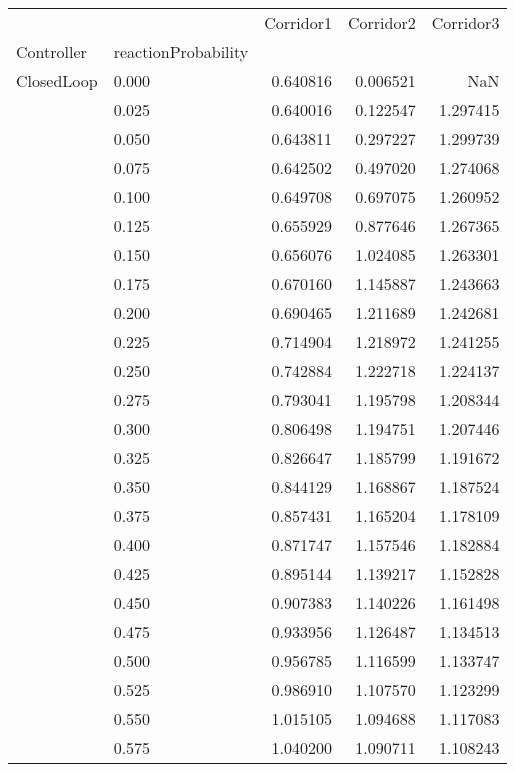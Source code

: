 \begin{tabular}{llrrr}
\toprule
         &       &  Corridor1 &  Corridor2 &  Corridor3 \\
Controller & reactionProbability &            &            &            \\
\midrule
ClosedLoop & 0.000 &   0.640816 &   0.006521 &        NaN \\
         & 0.025 &   0.640016 &   0.122547 &   1.297415 \\
         & 0.050 &   0.643811 &   0.297227 &   1.299739 \\
         & 0.075 &   0.642502 &   0.497020 &   1.274068 \\
         & 0.100 &   0.649708 &   0.697075 &   1.260952 \\
         & 0.125 &   0.655929 &   0.877646 &   1.267365 \\
         & 0.150 &   0.656076 &   1.024085 &   1.263301 \\
         & 0.175 &   0.670160 &   1.145887 &   1.243663 \\
         & 0.200 &   0.690465 &   1.211689 &   1.242681 \\
         & 0.225 &   0.714904 &   1.218972 &   1.241255 \\
         & 0.250 &   0.742884 &   1.222718 &   1.224137 \\
         & 0.275 &   0.793041 &   1.195798 &   1.208344 \\
         & 0.300 &   0.806498 &   1.194751 &   1.207446 \\
         & 0.325 &   0.826647 &   1.185799 &   1.191672 \\
         & 0.350 &   0.844129 &   1.168867 &   1.187524 \\
         & 0.375 &   0.857431 &   1.165204 &   1.178109 \\
         & 0.400 &   0.871747 &   1.157546 &   1.182884 \\
         & 0.425 &   0.895144 &   1.139217 &   1.152828 \\
         & 0.450 &   0.907383 &   1.140226 &   1.161498 \\
         & 0.475 &   0.933956 &   1.126487 &   1.134513 \\
         & 0.500 &   0.956785 &   1.116599 &   1.133747 \\
         & 0.525 &   0.986910 &   1.107570 &   1.123299 \\
         & 0.550 &   1.015105 &   1.094688 &   1.117083 \\
         & 0.575 &   1.040200 &   1.090711 &   1.108243 \\

\end{tabular}
